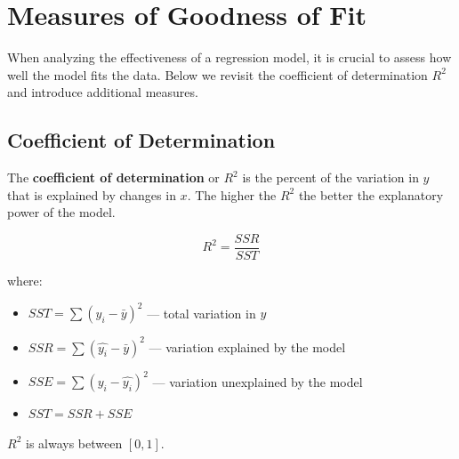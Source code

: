 \documentclass[
  11pt,
  letterpaper,
  DIV=11,
  numbers=noendperiod,
  oneside,
  open=any]{scrreprt}
\providecommand{\tightlist}{%
  \setlength{\itemsep}{0pt}\setlength{\parskip}{0pt}}\usepackage{longtable,booktabs,array}
\begin{document}
\section{Measures of Goodness of Fit}\label{measures-of-goodness-of-fit}

When analyzing the effectiveness of a regression model, it is crucial to
assess how well the model fits the data. Below we revisit the
coefficient of determination \(R^2\) and introduce additional measures.

\subsection*{Coefficient of
Determination}\label{coefficient-of-determination}

The \textbf{coefficient of determination} or \(R^2\) is the percent of
the variation in \(y\) that is explained by changes in \(x\). The higher
the \(R^2\) the better the explanatory power of the model.

\begin{bsformula}

\[R^2=\frac{SSR}{SST}\]

where:

\begin{itemize}
\tightlist
\item
  \(SST = \sum(y_i-\bar{y})^2\) --- total variation in \(y\)
\item
  \(SSR = \sum(\hat{y_i}-\bar{y})^2\) --- variation explained by the
  model
\item
  \(SSE = \sum(y_i-\hat{y_i})^2\) --- variation unexplained by the model
\item
  \(SST = SSR + SSE\)
\end{itemize}

\(R^2\) is always between \([0,1]\).

\end{bsformula}
\end{document}
